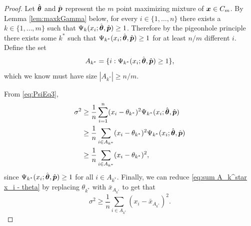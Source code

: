 		\begin{proof}
			Let $\hat{{\bm{{\theta}}}}$ and $\hat{{\bm{{p}}}}$ represent the $m$ point maximizing mixture of ${\bm{{x}}} \in C_m$. By Lemma \ref{lem:maxkGamma} below, for every $i \in \{1, \dots, n\}$ there exists a $k \in \{1, \dots, m\}$ such that $\Psi_{k}(x_i;\hat{{\bm{{\theta}}}},\hat{{\bm{{p}}}}) \geq 1$. Therefore by the pigeonhole principle there exists some $k^*$ such that $\Psi_{k^*}(x_i;\hat{{\bm{{\theta}}}},\hat{{\bm{{p}}}}) \geq 1$ for at least $n / m$ different $i$. Define the set
			\begin{equation}
			 	A_{k^*} = \{i : \Psi_{k^*}(x_i;\hat{{\bm{{\theta}}}},\hat{{\bm{{p}}}}) \geq 1 \},
			\end{equation}
			which we know must have size $|A_{k^*}| \geq n/m$.


			From \eqref{eq:PsiEq3},
			\begin{align}
				\sigma^2 &\geq \frac{1}{n} \sum_{i=1}^n (x_i - \theta_{k^*})^2 \Psi_{k^*}(x_i; \hat{{\bm{{\theta}}}}, \hat{{\bm{{p}}}})\\ 
					&\geq \frac{1}{n} \sum_{i \in A_{k^*}} (x_i - \theta_{k^*})^2 \Psi_{k^*}(x_i; \hat{{\bm{{\theta}}}}, \hat{{\bm{{p}}}})\\
					&\geq \frac{1}{n} \sum_{i \in A_{k^*}} (x_i - \theta_{k^*})^2,
					\label{eq:sum A_k^star x_i - theta}
			\end{align}
			since $\Psi_{k^*}(x_i;\hat{{\bm{{\theta}}}},\hat{{\bm{{p}}}}) \geq 1$ for all $i \in A_{k^*}$. Finally, we can reduce \eqref{eq:sum A_k^star x_i - theta} by replacing $\theta_{k^*}$ with $\bar{x}_{A_{k^*}}$ to get that
			\begin{equation}
				\sigma^2 \geq \frac{1}{n} \sum_{i \in A_{k^*}} \left(x_i - \bar{x}_{A_{k^*}}\right)^2.
			\end{equation}
		\end{proof}

